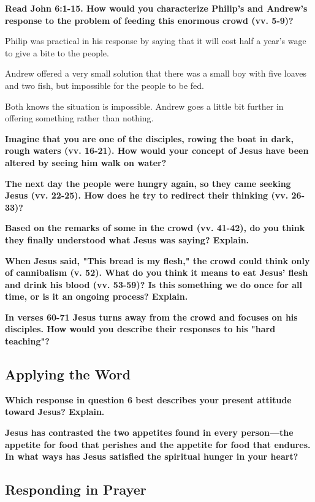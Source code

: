 \documentclass[11pt]{article}
\begin{document}
\textbf{\textbf{Read John 6:1-15. How would you characterize Philip's and Andrew's response to the problem of feeding this enormous crowd (vv. 5-9)?}}

Philip was practical in his response by saying that it will cost half a year's wage to give a bite to the people.

Andrew offered a very small solution that there was a small boy with five loaves and two fish, but impossible for the people to be fed.

Both knows the situation is impossible. Andrew goes a little bit further in offering something rather than nothing.


\textbf{\textbf{Imagine that you are one of the disciples, rowing the boat in dark, rough waters (vv. 16-21). How would your concept of Jesus have been altered by seeing him walk on water?}}

\textbf{\textbf{The next day the people were hungry again, so they came seeking Jesus (vv. 22-25). How does he try to redirect their thinking (vv. 26-33)?}}

\textbf{\textbf{Based on the remarks of some in the crowd (vv. 41-42), do you think they finally understood what Jesus was saying? Explain.}}

\textbf{\textbf{When Jesus said, "This bread is my flesh," the crowd could think only of cannibalism (v. 52). What do you think it means to eat Jesus' flesh and drink his blood (vv. 53-59)? Is this something we do once for all time, or is it an ongoing process? Explain.}}

\textbf{\textbf{In verses 60-71 Jesus turns away from the crowd and focuses on his disciples. How would you describe their responses to his "hard teaching"?}}

\subsection{Applying the Word}
\label{sec:org444588d}

\textbf{\textbf{Which response in question 6 best describes your present attitude toward Jesus? Explain.}}

\textbf{\textbf{Jesus has contrasted the two appetites found in every person—the appetite for food that perishes and the appetite for food that endures. In what ways has Jesus satisfied the spiritual hunger in your heart?}}

\subsection{Responding in Prayer}
\label{sec:org113dc4d}
\end{document}
